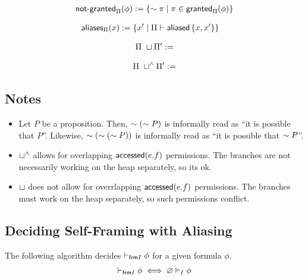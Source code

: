 \begin{align*}
\notgrantedPi(\phi) := \set{ \pnot \pi \mid \pi \in \grantedPi(\phi) }
\end{align*}

\begin{align*}
\aliasesPi(x) &:= \set{ x\p \mid \Pi \entails \aliased\set{x, x\p} }
\end{align*}



\begin{align*}
\Pi \ \merge \Pi\p := %
\end{align*}


\begin{align*}
\Pi \ \merge^\land \Pi\p := %
\end{align*}

\subsection{Notes}

\begin{itemize}
  \item
  Let $P$ be a proposition.
  Then, $\pnot (\pnot P)$ is informally read as ``it is possible that $P$''.
  Likewise, $\pnot (\pnot (\pnot P))$ is informally read as ``it is possible that $\pnot P$''.

  \item $\merge^\land$ allows for overlapping $\accessed(e.f)$ permissions. The branches are not necessarily working on the heap separately, so its ok.

  \item $\merge$ does not allow for overrlapping $\accessed(e.f)$ permissions. The branches must work on the heap separately, so such permissions conflict.
\end{itemize}

\subsection{Deciding Self-Framing with Aliasing}

\noindent
The following algorithm decides $\selfframes \phi$ for a given formula $\phi$.
\begin{align*}
\selfframes \phi \iff \empty \frames \phi
\end{align*}
